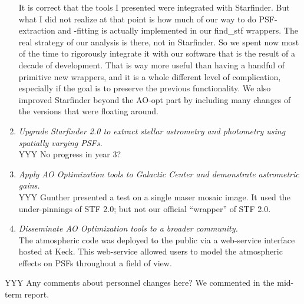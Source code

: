 \begin{enumerate}
  It is correct that the tools I presented were integrated with
  Starfinder. But what I did not realize at that point is how much of
  our way to do PSF-extraction and -fitting is actually implemented in
  our find\_stf wrappers. The real strategy of our analysis is there,
  not in Starfinder. So we spent now most of the time to rigorously
  integrate it with our software that is the result of a decade of
  development. That is way more useful than having a handful of
  primitive new wrappers, and it is a whole different level of
  complication, especially if the goal is to preserve the previous
  functionality. We also improved Starfinder beyond the AO-opt part by
  including many changes of the versions that were floating around. 


\item {\em Upgrade Starfinder 2.0 to extract stellar astrometry and
  photometry using spatially varying PSFs.} \\
  YYY No progress in year 3?

\item {\em Apply AO Optimization tools to Galactic Center and demonstrate
  astrometric gains.} \\
  YYY Gunther presented a test on a single maser mosaic image. It used
  the under-pinnings of STF 2.0; but not our official ``wrapper'' of
  STF 2.0.

\item {\em Disseminate AO Optimization tools to a broader community.} \\
  The atmospheric code was deployed to the public via a web-service
  interface hosted at Keck. This web-service allowed users to model
  the atmospheric effects on PSFs throughout a field of view. 
\end{enumerate}

YYY Any comments about personnel changes here? We commented in the
mid-term report.

